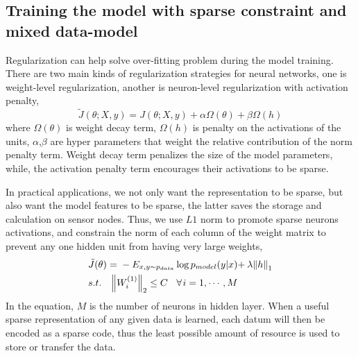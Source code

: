 \subsection{Training the model with sparse constraint and mixed data-model}
Regularization can help solve over-fitting problem during the model training.
There are two main kinds of regularization strategies for neural networks, one is weight-level regularization, another is neuron-level regularization with activation penalty,
\begin{equation}
\tilde J(\theta ;X,y) = J(\theta ;X,y) + \alpha \Omega (\theta )+ \beta \Omega (h)
\end{equation}
where $\Omega (\theta )$ is weight decay term, $\Omega (h)$ is penalty on the activations of the units, $\alpha$,$\beta$ are hyper parameters that weight the relative contribution of
the norm penalty term. Weight decay term penalizes the size of the model parameters, while, the activation penalty term encourages their activations to be sparse.

In practical applications, we not only want the representation to be sparse, but also want the model features to be sparse, the latter saves the storage and calculation on sensor nodes. Thus, we use $L1$ norm to promote sparse neurons activations, and constrain the norm of each column of the weight matrix to prevent any one hidden unit from having very large weights,
\begin{equation}
\begin{split}
&\tilde J(\theta ){\kern 1pt} {\kern 1pt} {\kern 1pt} {\rm{ = }}{\kern 1pt} {\kern 1pt} {\kern 1pt}  - {E_{x,y \sim {p_{data}}}}\log {p_{model}}(y|x){\rm{ + }}{\kern 1pt} {\kern 1pt} \lambda {\left\| h \right\|_1}\\
& s.t.{\kern 1pt} {\kern 1pt} {\kern 1pt} {\kern 1pt} {\kern 1pt} {\kern 1pt} {\kern 1pt} {\kern 1pt} {\kern 1pt} {\kern 1pt} {\left\| {{W^{(1)}_i}} \right\|_2} \le C{\kern 1pt} {\kern 1pt} {\kern 1pt} {\kern 1pt} {\kern 1pt} {\kern 1pt} {\kern 1pt} {\kern 1pt} {\kern 1pt} \forall {\kern 1pt} i = 1, \cdots ,M\\
\end{split}
\end{equation}
In the equation, $M$ is the number of neurons in hidden layer.
When a useful sparse representation of any given data is learned, each datum will then be encoded as a sparse code, thus the least possible amount of resource is used to store or transfer the data.

